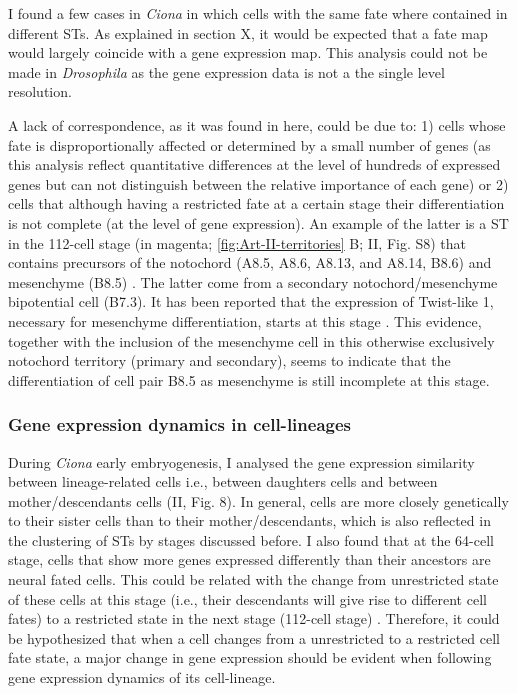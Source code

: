 
I found a few cases in \textit{Ciona} in which cells with the same fate where contained in different STs. As explained in section X, it would be expected that a fate map would largely coincide with a gene expression map. This analysis could not be made in \textit{Drosophila} as the gene expression data is not a the single level resolution.

A lack of correspondence, as it was found in here, could be due to: 1) cells whose fate is disproportionally affected or determined by a small number of genes (as this analysis reflect quantitative differences at the level of hundreds of expressed genes but can not distinguish between the relative importance of each gene) or 2) cells that although having a restricted fate at a certain stage their differentiation is not complete (at the level of gene expression).
%
An example of the latter is a ST in the 112-cell stage (in magenta; \ref{fig:Art-II-territories} B; II, Fig. S8) that contains precursors of the notochord (A8.5, A8.6, A8.13, and A8.14, B8.6) and mesenchyme (B8.5) \citep{Tokuoka2004}.
The latter come from a secondary notochord/mesenchyme bipotential cell (B7.3). It has been reported that the expression of Twist-like 1, necessary for mesenchyme differentiation, starts at this stage \citep{Imai2003}.
This evidence, together with the inclusion of the mesenchyme cell in this otherwise exclusively notochord territory (primary and secondary), seems to indicate that the differentiation of cell pair B8.5 as mesenchyme is still incomplete at this stage.

\subsubsection{Gene expression dynamics in cell-lineages}

During \textit{Ciona} early embryogenesis, I analysed the gene expression similarity between lineage-related cells i.e., between daughters cells and between mother/descendants cells (II, Fig. 8).
In general, cells are more closely genetically to their sister cells than to their mother/descendants, which is also reflected in the clustering of STs by stages discussed before.
I also found that at the 64-cell stage, cells that show more genes expressed differently than their ancestors are neural fated cells. This could be related with the change from unrestricted state of these cells at this stage (i.e., their descendants will give rise to different cell fates) to a restricted state in the next stage (112-cell stage) \citep{Imai2006}.
Therefore, it could be hypothesized that when a cell changes from a unrestricted to a restricted cell fate state, a major change in gene expression should be evident when following gene expression dynamics of its cell-lineage.  